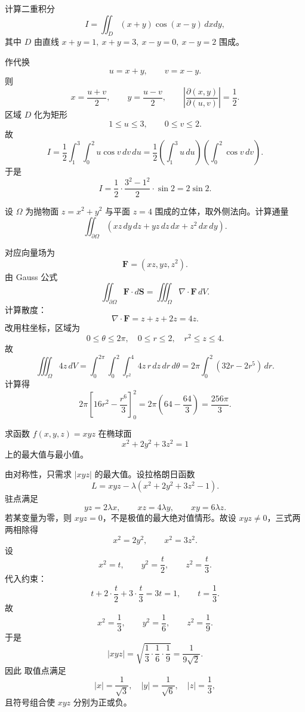 \begin{question}
计算二重积分
\[
I=\iint_D (x+y)\cos(x-y)\,dxdy,
\]
其中 $D$ 由直线 $x+y=1,\ x+y=3,\ x-y=0,\ x-y=2$ 围成。
\begin{solution}

作代换
\[
u=x+y,\qquad v=x-y.
\]
则
\[
x=\frac{u+v}{2},\qquad y=\frac{u-v}{2},
\qquad \left|\frac{\partial(x,y)}{\partial(u,v)}\right|=\frac12.
\]
区域 $D$ 化为矩形
\[
1\le u\le 3,
\qquad 0\le v\le 2.
\]
故
\[
I=\frac12\int_1^3\!\int_0^2 u\cos v\,dv\,du
=\frac12\left(\int_1^3u\,du\right)\left(\int_0^2\cos v\,dv\right).
\]
于是
\[
I=\frac12\cdot\frac{3^2-1^2}{2}\cdot \sin2
=\boxed{2\sin2}.
\]
\end{solution}
\end{question}

\begin{question}
设 $\Omega$ 为抛物面 $z=x^2+y^2$ 与平面 $z=4$ 围成的立体，取外侧法向。计算通量
\[
\iint_{\partial\Omega}(xz\,dy\,dz+yz\,dz\,dx+z^2\,dx\,dy).
\]
\begin{solution}

对应向量场为
\[
\mathbf F=(xz,yz,z^2).
\]
由 Gauss 公式
\[
\iint_{\partial\Omega}\mathbf F\cdot d\mathbf S
=\iiint_{\Omega}\nabla\cdot \mathbf F\,dV.
\]
计算散度：
\[
\nabla\cdot\mathbf F=z+z+2z=4z.
\]
改用柱坐标，区域为
\[
0\le \theta\le 2\pi,
\quad 0\le r\le 2,
\quad r^2\le z\le 4.
\]
故
\[
\iiint_{\Omega}4z\,dV
=\int_0^{2\pi}\!\int_0^2\!\int_{r^2}^{4}4z\,r\,dz\,dr\,d\theta
=2\pi\int_0^2(32r-2r^5)\,dr.
\]
计算得
\[
2\pi\left[16r^2-\frac{r^6}{3}\right]_0^2
=2\pi\left(64-\frac{64}{3}\right)
=\boxed{\frac{256\pi}{3}}.
\]
\end{solution}
\end{question}

\begin{question}
求函数 $f(x,y,z)=xyz$ 在椭球面
\[
x^2+2y^2+3z^2=1
\]
上的最大值与最小值。
\begin{solution}

由对称性，只需求 $|xyz|$ 的最大值。设拉格朗日函数
\[
L=xyz-\lambda(x^2+2y^2+3z^2-1).
\]
驻点满足
\[
yz=2\lambda x,
\qquad xz=4\lambda y,
\qquad xy=6\lambda z.
\]
若某变量为零，则 $xyz=0$，不是极值的最大绝对值情形。故设 $xyz\neq0$，三式两两相除得
\[
x^2=2y^2,
\qquad x^2=3z^2.
\]
设
\[
x^2=t,
\qquad y^2=\frac t2,
\qquad z^2=\frac t3.
\]
代入约束：
\[
t+2\cdot\frac t2+3\cdot\frac t3=3t=1,
\qquad t=\frac13.
\]
故
\[
x^2=\frac13,
\qquad y^2=\frac16,
\qquad z^2=\frac19.
\]
于是
\[
|xyz|=\sqrt{\frac13\cdot\frac16\cdot\frac19}=\frac{1}{9\sqrt2}.
\]
因此
取值点满足
\[
|x|=\frac1{\sqrt3},\quad |y|=\frac1{\sqrt6},\quad |z|=\frac13,
\]
且符号组合使 $xyz$ 分别为正或负。
\end{solution}
\end{question}


